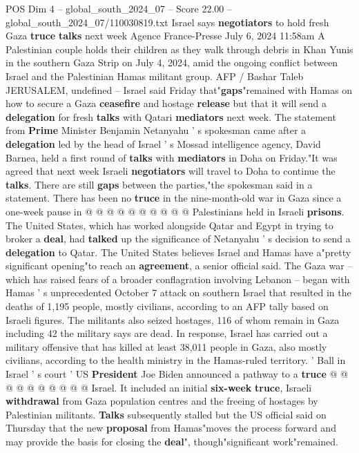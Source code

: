 \begin{textsample}{POS Dim 4 – global\_south\_2024\_07 – Score 22.00 – global\_south\_2024\_07/110030819.txt}  \label{ex:f4_pos_117}
Israel says \textbf{negotiators} to hold fresh Gaza \textbf{truce} \textbf{talks} next week Agence France-Presse July 6, 2024 11:58am A Palestinian couple holds their children as they walk through debris in Khan Yunis in the southern Gaza Strip on July 4, 2024, amid the ongoing conflict between Israel and the Palestinian Hamas militant group.
AFP / Bashar Taleb JERUSALEM, undefined -- Israel said Friday that"\textbf{gaps}"remained with Hamas on how to secure a Gaza \textbf{ceasefire} and hostage \textbf{release} but that it will send a \textbf{delegation} for fresh \textbf{talks} with Qatari \textbf{mediators} next week.
The statement from \textbf{Prime} Minister Benjamin Netanyahu ' s spokesman came after a \textbf{delegation} led by the head of Israel ' s Mossad intelligence agency, David Barnea, held a first round of \textbf{talks} with \textbf{mediators} in Doha on Friday."It was agreed that next week Israeli \textbf{negotiators} will travel to Doha to continue the \textbf{talks}.
There are still \textbf{gaps} between the parties,"the spokesman said in a statement.
There has been no \textbf{truce} in the nine-month-old war in Gaza since a one-week pause in @ @ @ @ @ @ @ @ @ @ Palestinians held in Israeli \textbf{prisons}.
The United States, which has worked alongside Qatar and Egypt in trying to broker a \textbf{deal}, had \textbf{talked} up the significance of Netanyahu ' s decision to send a \textbf{delegation} to Qatar.
The United States believes Israel and Hamas have a"pretty significant opening"to reach an \textbf{agreement}, a senior official said.
The Gaza war -- which has raised fears of a broader conflagration involving Lebanon -- began with Hamas ' s unprecedented October 7 attack on southern Israel that resulted in the deaths of 1,195 people, mostly civilians, according to an AFP tally based on Israeli figures.
The militants also seized hostages, 116 of whom remain in Gaza including 42 the military says are dead.
In response, Israel has carried out a military offensive that has killed at least 38,011 people in Gaza, also mostly civilians, according to the health ministry in the Hamas-ruled territory. ' Ball in Israel ' s court ' US \textbf{President} Joe Biden announced a pathway to a \textbf{truce} @ @ @ @ @ @ @ @ @ @ Israel.
It included an initial \textbf{six-week} \textbf{truce}, Israeli \textbf{withdrawal} from Gaza population centres and the freeing of hostages by Palestinian militants. \textbf{Talks} subsequently stalled but the US official said on Thursday that the new \textbf{proposal} from Hamas"moves the process forward and may provide the basis for closing the \textbf{deal}", though"significant work"remained.

\end{textsample}
